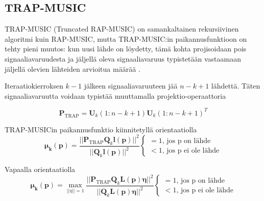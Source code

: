\subsection{TRAP-MUSIC}
TRAP-MUSIC (Truncated RAP-MUSIC) on samankaltainen rekursiivinen algoritmi kuin RAP-MUSIC, mutta TRAP-MUSIC:in paikannusfunktioon on tehty pieni muutos: kun uusi lähde on löydetty, tämä kohta projisoidaan pois signaaliavaruudesta ja jäljellä oleva signaaliavaruus typistetään vastaamaan jäljellä olevien lähteiden arvioitua määrää \citep{Makela2018TruncatedLocalization}.

Iteraatiokierroksen $k-1$ jälkeen signaaliavaruuteen jää $n-k+1$ lähdettä. Täten signaaliavaruutta voidaan typistää muuttamalla projektio-operaattoria

\begin{equation}
    \mathbf{P}_{\text{TRAP}} = \mathbf{U}_k(1:n-k+1)\mathbf{U}_k(1:n-k+1)^T
\end{equation}

TRAP-MUSICin paikannusfunktio kiinnitetyllä orientaatiolla
\begin{equation}
    \mathbf{\mu_k(p)} = \frac{||\mathbf{P}_{\text{TRAP}}\mathbf{Q}_k\mathbf{l(p)}||^2}{||\mathbf{Q}_k\mathbf{l(p)}||^2}
    \begin{cases}
    =1\text{, jos p on lähde}\\
    <1\text{, jos p ei ole lähde}
     \end{cases}
     \label{eq:TRAPfix}
\end{equation}

Vapaalla orientaatiolla
\begin{equation}
    \mathbf{\mu_k(p)} = \max_{||\eta||=1} \frac{||\mathbf{P}_{\text{TRAP}}\mathbf{Q}_k\mathbf{L(p)\eta}||^2}{||\mathbf{Q}_k\mathbf{L(p)\eta}||^2}
    \begin{cases}
    =1\text{, jos p on lähde}\\
    <1\text{, jos p ei ole lähde}
     \end{cases}
     \label{eq:TRAPfree}
\end{equation}